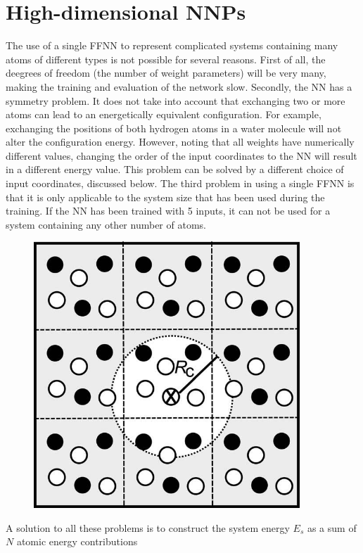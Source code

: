 \documentclass[twoside,english]{uiofysmaster}
\begin{document}
\section{High-dimensional NNPs}
The use of a single FFNN to represent complicated systems containing many atoms of different types is not possible for several reasons.
First of all, the deegrees of freedom (the number of weight parameters) will be very many, making the training and evaluation
of the network slow. Secondly, the NN has a symmetry problem. It does not take into account that exchanging two or more atoms
can lead to an energetically equivalent configuration. For example, exchanging the positions of both hydrogen atoms
in a water molecule will not alter the configuration energy. However, noting that all weights have numerically different values,
changing the order of the input coordinates to the NN will result in a different energy value. This problem can be solved
by a different choice of input coordinates, discussed below. The third problem in using a single FFNN is that it is 
only applicable to the system size that has been used during the training. If the NN has been trained with 5 inputs, 
it can not be used for a system containing any other number of atoms. 
\begin{figure}[H]
\begin{center}
  \includegraphics[width = 100mm]{Figures/Theory/cutOffHighDimNN.jpeg}
  \caption{}
  \label{fig:cutOffNeighbours}
  \end{center}
\end{figure}
A solution to all these problems is to construct the system energy $E_s$ as a sum of $N$ atomic energy contributions
\end{document}

